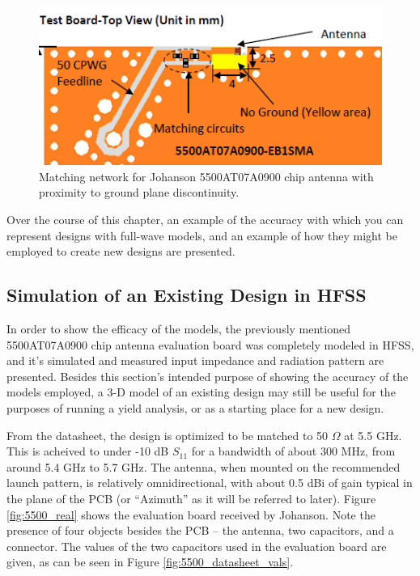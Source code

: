 \documentclass[12pt]{usfcoe}
\begin{document}
    \begin{figure}[H]
		\begin{center}
        	\includegraphics[width=4.5in]{images/2450_reconfig/5500_dev_board.PNG} 
			\caption{Matching network for Johanson 5500AT07A0900 chip antenna with proximity to ground plane discontinuity.} 
			\label{fig:5500_matching_network}
		\end{center}
	\end{figure}    
    
    Over the course of this chapter, an example of the accuracy with which you can represent designs with full-wave models, and an example of how they might be employed to create new designs are presented. 
    
    \subsection{Simulation of an Existing Design in HFSS}

    In order to show the efficacy of the models, the previously mentioned 5500AT07A0900 chip antenna evaluation board was completely modeled in HFSS, and it's simulated and measured input impedance and radiation pattern are presented.
    Besides this section's intended purpose of showing the accuracy of the models employed, a 3-D model of an existing design may still be useful for the purposes of running a yield analysis, or as a starting place for a new design.

    From the datasheet, the design is optimized to be matched to 50 $\Omega$ at 5.5 GHz.
    This is acheived to under -10 dB $S_{11}$ for a bandwidth of about 300 MHz, from around 5.4 GHz to 5.7 GHz.
    The antenna, when mounted on the recommended launch pattern, is relatively omnidirectional, with about 0.5 dBi of gain typical in the plane of the PCB (or ``Azimuth'' as it will be referred to later).
    Figure \ref{fig:5500_real} shows the evaluation board received by Johanson. Note the presence of four objects besides the PCB -- the antenna, two capacitors, and a connector.
    The values of the two capacitors used in the evaluation board are given, as can be seen in Figure \ref{fig:5500_datasheet_vals}.
 
\end{document}

